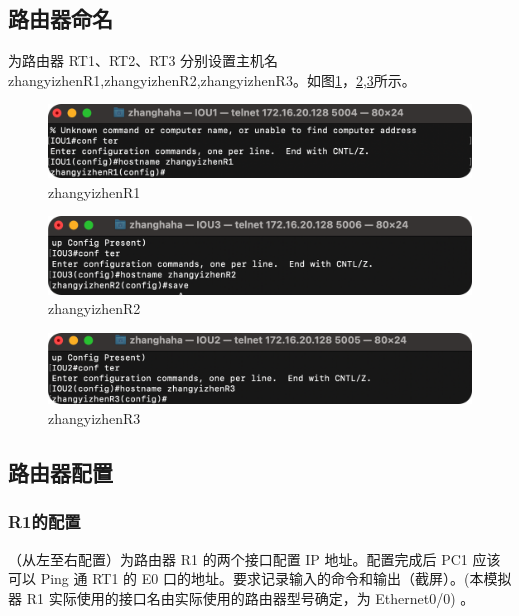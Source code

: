 \documentclass[a4paper,12pt]{report}
\begin{document}
\begin{spacing}{1.5}
\subsection{路由器命名}
为路由器 RT1、RT2、RT3 分别设置主机名zhangyizhenR1,zhangyizhenR2,zhangyizhenR3。如图\ref{4}，\ref{5},\ref{6}所示。
\begin{figure}[htb!]
  \centering
\includegraphics[width=12cm]{figure/r1.png}
\caption{zhangyizhenR1}
\label{4}
\end{figure}
\begin{figure}[htb!]
  \centering
\includegraphics[width=12cm]{figure/r2.png}
\caption{zhangyizhenR2}
\label{5}
\end{figure}
\begin{figure}[htb!]
  \centering
\includegraphics[width=12cm]{figure/r3.png}
\caption{zhangyizhenR3}
\label{6}
\end{figure}

\subsection{路由器配置}

\subsubsection{R1的配置}
（从左至右配置）为路由器 R1 的两个接口配置 IP 地址。配置完成后 PC1 应该可以 Ping 通 RT1 的 E0 口的地址。要求记录输入的命令和输出（截屏）。(本模拟器 R1 实际使用的接口名由实际使用的路由器型号确定，为 Ethernet0/0) 。


\end{spacing}
\end{document}
